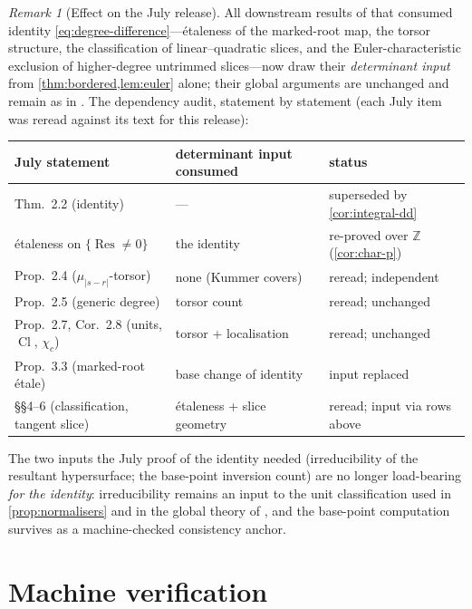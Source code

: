 \documentclass[11pt,reqno]{amsart}
\theoremstyle{definition}
\theoremstyle{remark}
\newtheorem{remark}[remark]{Remark}
\newcommand{\Z}{\mathbb Z}
\newcommand{\Cl}{\operatorname{Cl}}
\newcommand{\Res}{\operatorname{Res}}
\newcommand{\abs}[1]{\lvert #1\rvert}
\begin{document}
\begin{remark}[Effect on the July release]\label{rem:effect}
All downstream results of \cite{DDAS} that consumed identity
\eqref{eq:degree-difference}---\'etaleness of the marked-root map,
the torsor structure, the classification of linear--quadratic slices,
and the Euler-characteristic exclusion of higher-degree untrimmed
slices---now draw their \emph{determinant input} from
\cref{thm:bordered,lem:euler} alone; their global arguments are
unchanged and remain as in \cite{DDAS}.  The dependency audit,
statement by statement (each July item was reread against its text
for this release):

\begin{center}
\small
\begin{tabular}{@{}lll@{}}
\toprule
July statement & determinant input consumed & status \\
\midrule
Thm.~2.2 (identity) & --- & superseded by \cref{cor:integral-dd} \\
\'etaleness on $\{\Res\ne0\}$ & the identity & re-proved over $\Z$ (\cref{cor:char-p}) \\
Prop.~2.4 ($\mu_{\abs{s-r}}$-torsor) & none (Kummer covers) & reread; independent \\
Prop.~2.5 (generic degree) & torsor count & reread; unchanged \\
Prop.~2.7, Cor.~2.8 (units, $\Cl$, $\chi_c$) & torsor + localisation & reread; unchanged \\
Prop.~3.3 (marked-root \'etale) & base change of identity & input replaced \\
\S\S4--6 (classification, tangent slice) & \'etaleness + slice geometry & reread; input via rows above \\
\bottomrule
\end{tabular}
\end{center}

The two inputs the July
proof of the identity needed (irreducibility of the resultant
hypersurface; the base-point inversion count) are no longer
load-bearing \emph{for the identity}: irreducibility remains an input
to the unit classification used in \cref{prop:normalisers} and in
the global theory of \cite{DDAS}, and the base-point computation
survives as a machine-checked consistency anchor.
\end{remark}

\section{Machine verification}\label{sec:verification}
\end{document}
